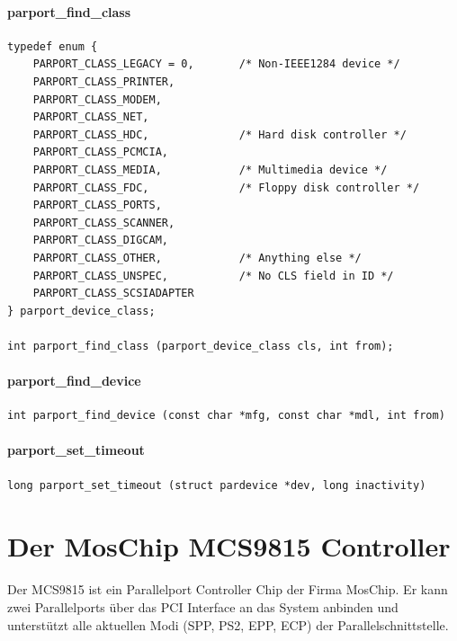 \documentclass[a4paper,11pt]{article}
\begin{document}
\paragraph{parport\_find\_class}
\begin{verbatim}
typedef enum {
	PARPORT_CLASS_LEGACY = 0,       /* Non-IEEE1284 device */
	PARPORT_CLASS_PRINTER,
	PARPORT_CLASS_MODEM,
	PARPORT_CLASS_NET,
	PARPORT_CLASS_HDC,              /* Hard disk controller */
	PARPORT_CLASS_PCMCIA,
	PARPORT_CLASS_MEDIA,            /* Multimedia device */
	PARPORT_CLASS_FDC,              /* Floppy disk controller */
	PARPORT_CLASS_PORTS,
	PARPORT_CLASS_SCANNER,
	PARPORT_CLASS_DIGCAM,
	PARPORT_CLASS_OTHER,            /* Anything else */
	PARPORT_CLASS_UNSPEC,           /* No CLS field in ID */
	PARPORT_CLASS_SCSIADAPTER
} parport_device_class;

int parport_find_class (parport_device_class cls, int from);
\end{verbatim}


\paragraph{parport\_find\_device}
\begin{verbatim}
int parport_find_device (const char *mfg, const char *mdl, int from)
\end{verbatim}


\paragraph{parport\_set\_timeout}
\begin{verbatim}
long parport_set_timeout (struct pardevice *dev, long inactivity)
\end{verbatim}


\section{Der MosChip MCS9815 Controller}

Der MCS9815 ist ein Parallelport Controller Chip der Firma MosChip. Er kann
zwei Parallelports über das PCI Interface an das System anbinden und unterstützt alle
aktuellen Modi (SPP, PS2, EPP, ECP) der Parallelschnittstelle.
\end{document}
